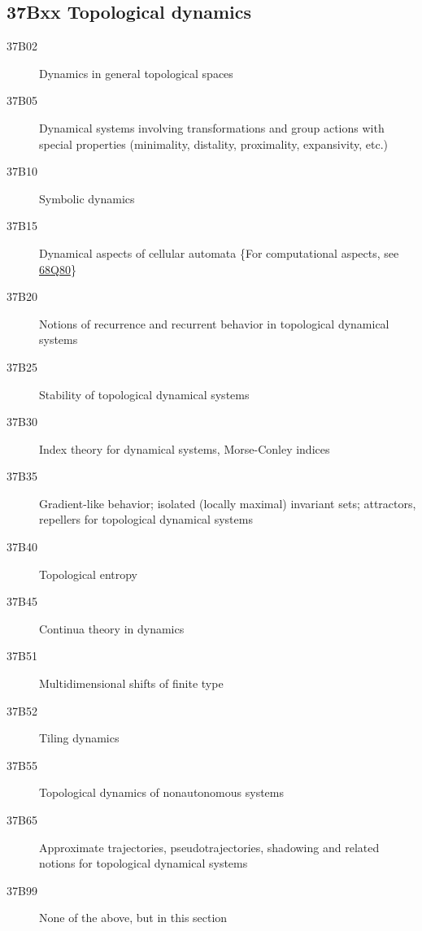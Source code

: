 \documentclass[letterpaper]{article}
\begin{document}
\subsection*{37Bxx  Topological dynamics  }\label{37Bxx}
\begin{description}  
\item [37B02]\label{37B02} Dynamics in general topological spaces 
\item [37B05]\label{37B05} Dynamical systems involving transformations and group actions with special properties (minimality, distality, proximality, expansivity, etc.)
\item [37B10]\label{37B10} Symbolic dynamics 
\item [37B15]\label{37B15} Dynamical aspects of cellular automata  \{For computational aspects, see  \hyperref[68Q80]{68Q80}\}
\item [37B20]\label{37B20} Notions of recurrence and recurrent behavior in topological dynamical systems
\item [37B25]\label{37B25} Stability of topological dynamical systems
\item [37B30]\label{37B30} Index theory for dynamical systems, Morse-Conley indices 
\item [37B35]\label{37B35} Gradient-like behavior; isolated (locally maximal) invariant sets; attractors, repellers for topological dynamical systems
\item [37B40]\label{37B40} Topological entropy 
\item [37B45]\label{37B45} Continua theory in dynamics
\item [37B51]\label{37B51} Multidimensional shifts of finite type  
\item [37B52]\label{37B52} Tiling dynamics
\item [37B55]\label{37B55} Topological dynamics of nonautonomous systems
\item [37B65]\label{37B65} Approximate trajectories, pseudotrajectories, shadowing and related notions for topological dynamical systems
\item [37B99]\label{37B99} None of the above, but in this section
\end{description}
\end{document}
